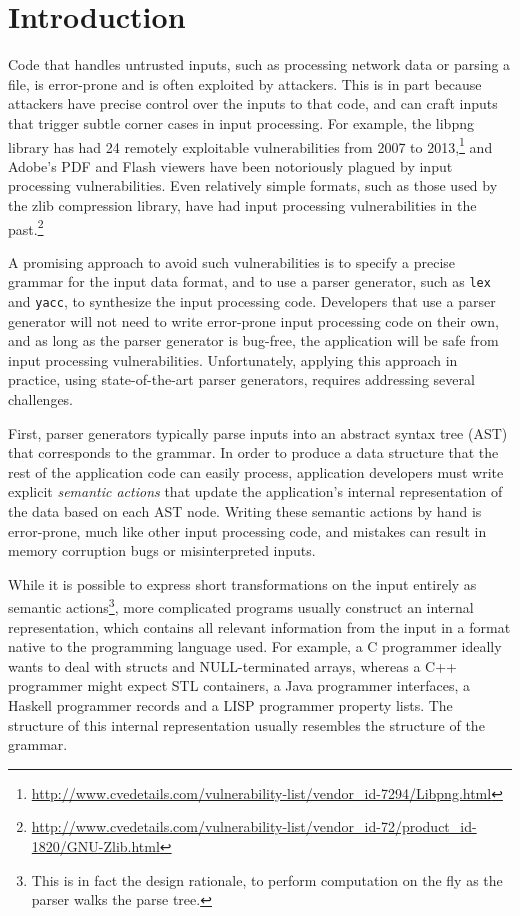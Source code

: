 \section{Introduction}

Code that handles untrusted inputs, such as processing network
data or parsing a file, is error-prone and is often exploited by
attackers.  This is in part because attackers have precise control
over the inputs to that code, and can craft inputs that trigger
subtle corner cases in input processing.  For example, the libpng
library has had 24 remotely exploitable vulnerabilities from 2007 to
2013,\footnote{\url{http://www.cvedetails.com/vulnerability-list/vendor_id-7294/Libpng.html}}
and Adobe's PDF and Flash viewers have been notoriously
plagued by input processing vulnerabilities.  Even relatively
simple formats, such as those used by the zlib compression
library, have had input processing vulnerabilities in the
past.\footnote{\url{http://www.cvedetails.com/vulnerability-list/vendor_id-72/product_id-1820/GNU-Zlib.html}}

A promising approach to avoid such vulnerabilities is to specify a
precise grammar for the input data format, and to use a parser generator,
such as {\tt lex} and {\tt yacc}, to synthesize the input processing
code.  Developers that use a parser generator will not need to write
error-prone input processing code on their own, and as long as the
parser generator is bug-free, the application will be safe from input
processing vulnerabilities.  Unfortunately, applying this approach in
practice, using state-of-the-art parser generators, requires addressing
several challenges.

First, parser generators typically parse inputs into an abstract syntax
tree (AST) that corresponds to the grammar.  In order to produce a data
structure that the rest of the application code can easily process,
application developers must write explicit {\em semantic actions} that
update the application's internal representation of the data based on
each AST node.  Writing these semantic actions by hand is error-prone,
much like other input processing code, and mistakes can result in memory
corruption bugs or misinterpreted inputs.



While it is possible to express short transformations on the input
entirely as semantic actions\footnote{This is in fact the design
rationale, to perform computation on the fly as the parser walks the
parse tree.}, more complicated programs usually construct an internal
representation, which contains all relevant information from the input
in a format native to the programming language used. For example, a C
programmer ideally wants to deal with structs and NULL-terminated arrays,
whereas a C++ programmer might expect STL containers, a Java programmer
interfaces, a Haskell programmer records and a LISP programmer property
lists.  The structure of this internal representation usually resembles
the structure of the grammar.

